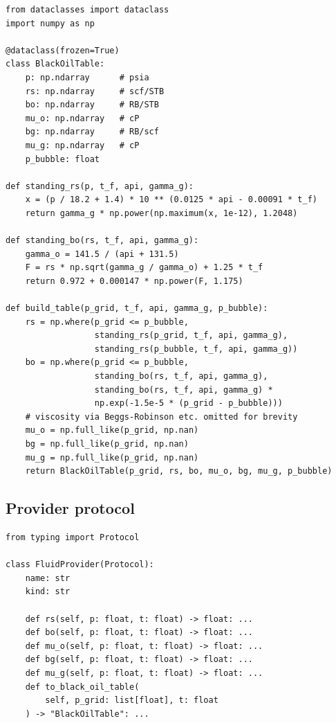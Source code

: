 \documentclass[11pt,a4paper]{article}
\begin{document}
\begin{lstlisting}[caption={Black-oil PVT table builder.}]
from dataclasses import dataclass
import numpy as np

@dataclass(frozen=True)
class BlackOilTable:
    p: np.ndarray      # psia
    rs: np.ndarray     # scf/STB
    bo: np.ndarray     # RB/STB
    mu_o: np.ndarray   # cP
    bg: np.ndarray     # RB/scf
    mu_g: np.ndarray   # cP
    p_bubble: float

def standing_rs(p, t_f, api, gamma_g):
    x = (p / 18.2 + 1.4) * 10 ** (0.0125 * api - 0.00091 * t_f)
    return gamma_g * np.power(np.maximum(x, 1e-12), 1.2048)

def standing_bo(rs, t_f, api, gamma_g):
    gamma_o = 141.5 / (api + 131.5)
    F = rs * np.sqrt(gamma_g / gamma_o) + 1.25 * t_f
    return 0.972 + 0.000147 * np.power(F, 1.175)

def build_table(p_grid, t_f, api, gamma_g, p_bubble):
    rs = np.where(p_grid <= p_bubble,
                  standing_rs(p_grid, t_f, api, gamma_g),
                  standing_rs(p_bubble, t_f, api, gamma_g))
    bo = np.where(p_grid <= p_bubble,
                  standing_bo(rs, t_f, api, gamma_g),
                  standing_bo(rs, t_f, api, gamma_g) *
                  np.exp(-1.5e-5 * (p_grid - p_bubble)))
    # viscosity via Beggs-Robinson etc. omitted for brevity
    mu_o = np.full_like(p_grid, np.nan)
    bg = np.full_like(p_grid, np.nan)
    mu_g = np.full_like(p_grid, np.nan)
    return BlackOilTable(p_grid, rs, bo, mu_o, bg, mu_g, p_bubble)
\end{lstlisting}

\subsection{Provider protocol}

\begin{lstlisting}[caption={Fluid provider interface.}]
from typing import Protocol

class FluidProvider(Protocol):
    name: str
    kind: str

    def rs(self, p: float, t: float) -> float: ...
    def bo(self, p: float, t: float) -> float: ...
    def mu_o(self, p: float, t: float) -> float: ...
    def bg(self, p: float, t: float) -> float: ...
    def mu_g(self, p: float, t: float) -> float: ...
    def to_black_oil_table(
        self, p_grid: list[float], t: float
    ) -> "BlackOilTable": ...
\end{lstlisting}
\end{document}
